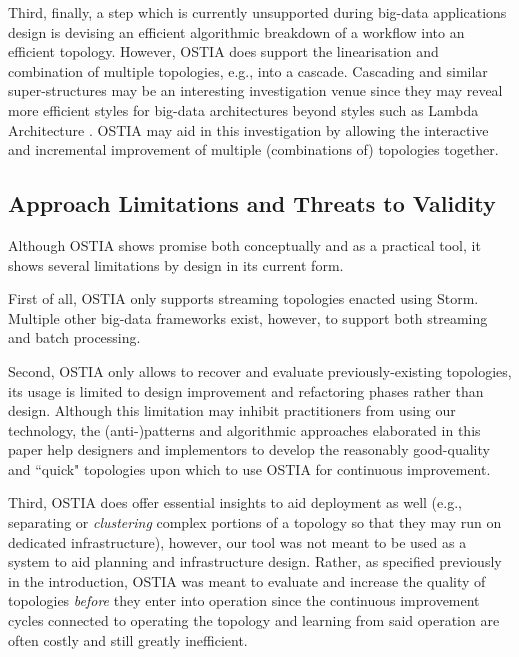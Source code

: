 Third, finally, a step which is currently unsupported during big-data applications design is devising an efficient algorithmic breakdown of a workflow into an efficient topology. However, OSTIA does support the linearisation and combination of multiple topologies, e.g., into a cascade. Cascading and similar super-structures may be an interesting investigation venue since they may reveal more efficient styles for big-data architectures beyond styles such as Lambda Architecture \cite{lambda}. OSTIA may aid in this investigation by allowing the interactive and incremental improvement of multiple (combinations of) topologies together.

\subsection{Approach Limitations and Threats to Validity}

Although OSTIA shows promise both conceptually and as a practical tool, it shows several limitations by design in its current form.

First of all, OSTIA only supports streaming topologies enacted using Storm. Multiple other big-data frameworks exist, however, to support both streaming and batch processing. 

Second, OSTIA only allows to recover and evaluate previously-existing topologies, its usage is limited to design improvement and refactoring phases rather than design. Although this limitation may inhibit practitioners from using our technology, the (anti-)patterns and algorithmic approaches elaborated in this paper help designers and implementors to develop the reasonably good-quality and ``quick" topologies upon which to use OSTIA for continuous improvement.

Third, OSTIA does offer essential insights to aid deployment as well (e.g., separating or \emph{clustering} complex portions of a topology so that they may run on dedicated infrastructure), however, our tool was not meant to be used as a system to aid planning and infrastructure design. Rather, as specified previously in the introduction, OSTIA was meant to evaluate and increase the quality of topologies \emph{before} they enter into operation since the continuous improvement cycles connected to operating the topology and learning from said operation are often costly and still greatly inefficient.



